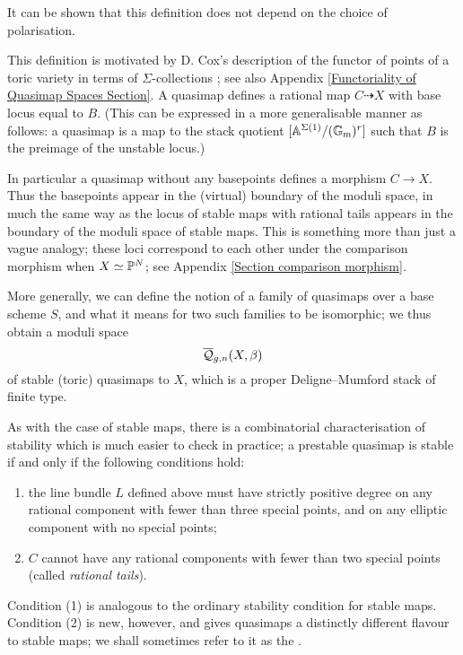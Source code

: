 It can be shown that this definition does not depend on the choice of polarisation.

\begin{remark} This definition is motivated by D. Cox's description of the functor of points of a toric variety in terms of $\Sigma$-collections \cite{CoxFunctor}; see also Appendix \ref{Functoriality of Quasimap Spaces Section}. A quasimap defines a rational map $C \dashrightarrow X$ with base locus equal to $B$. (This can be expressed in a more generalisable manner as follows: a quasimap is a map to the stack quotient $[\mathbb{A}^{\Sigma(1)} / (\mathbb{G}_{\text{m}})^r]$ such that $B$ is the preimage of the unstable locus.)

In particular a quasimap without any basepoints defines a morphism $C \to X$. Thus the basepoints appear in the (virtual) boundary of the moduli space, in much the same way as the locus of stable maps with rational tails appears in the boundary of the moduli space of stable maps. This is something more than just a vague analogy; these loci correspond to each other under the comparison morphism when $X\simeq\mathbb P^N$; see Appendix \ref{Section comparison morphism}. \end{remark}

More generally, we can define the notion of a family of quasimaps over a base scheme $S$, and what it means for two such families to be isomorphic; we thus obtain a moduli space
\begin{equation*} \overline{\mathcal Q}_{g,n}(X,\beta) \end{equation*}
of stable (toric) quasimaps to $X$, which is a proper Deligne--Mumford stack of finite type.


As with the case of stable maps, there is a combinatorial characterisation of stability which is much easier to check in practice; a prestable quasimap is stable if and only if the following conditions hold:
\begin{enumerate}
\item the line bundle $L$ defined above must have strictly positive degree on any rational component with fewer than three special points, and on any elliptic component with no special points;
\item $C$ cannot have any rational components with fewer than two special points (called \emph{rational tails}).
\end{enumerate}
Condition (1) is analogous to the ordinary stability condition for stable maps. Condition (2) is new, however, and gives quasimaps a distinctly different flavour to stable maps; we shall sometimes refer to it as the . 

